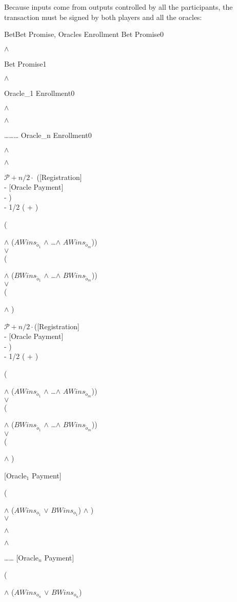 Because inputs come from outputs controlled by all the participants, the
  transaction must be signed by both players and all the oracles:
\newpage
{\small
\transaction
    {Bet}{Bet Promise, Oracles Enrollment}
    {Bet Promise}{0}{\signature{A} $\wedge$ \signature{B}}
    {Bet Promise}{1}{\signature{A} $\wedge$ \signature{B}}
    {Oracle_1 Enrollment}{0}
        {\signature{A} $\wedge$ \signature{B} $\wedge$ \signature{o_1}}
    {\ldots}{\ldots}{\ldots}
    {Oracle_n Enrollment}{0}
        {\signature{A} $\wedge$ \signature{B} $\wedge$ \signature{o_n}}
    \stopinputs
    {$\mathcal{P} + n/2 \cdot$ ([Registration] \\
            - [Oracle Payment] \\
            - ) \\
            - 1/2 ( + )}
        {(\signature{A} $\wedge$ ($AWins_{\tilde{o}_1}$ $\wedge$ \ldots $\wedge$ $AWins_{\tilde{o}_m}$)) \\
                          $\vee$ \\
         (\signature{B} $\wedge$ ($BWins_{\tilde{o}_1}$ $\wedge$ \ldots $\wedge$ $BWins_{\tilde{o}_m}$)) \\
                                    $\vee$ \\
         (\signature{A} $\wedge$ )}
    {$\mathcal{P} + n/2 \cdot $([Registration] \\
            - [Oracle Payment] \\
            - ) \\
            - 1/2 ( + )}
        {(\signature{A} $\wedge$ ($AWins_{\tilde{o}_1}$ $\wedge$ \ldots $\wedge$ $AWins_{\tilde{o}_m}$)) \\
                          $\vee$ \\
         (\signature{B} $\wedge$ ($BWins_{\tilde{o}_1}$ $\wedge$ \ldots $\wedge$ $BWins_{\tilde{o}_m}$)) \\
                                    $\vee$ \\
         (\signature{B} $\wedge$ )}
    {[Oracle$_{1}$ Payment]}{(\signature{o_{1}} $\wedge$ ($AWins_{o_{1}}$ $\vee$ $BWins_{o_{1}}$) %
                      $\wedge$ ) \\
                      $\vee$ \\
                       \signature{A} $\wedge$ \signature{B} $\wedge$ }
    {\ldots}{\ldots}
    {[Oracle$_{n}$ Payment]}{(\signature{o_{n}} $\wedge$ ($AWins_{o_{n}}$ $\vee$ $BWins_{o_{n}}$) %
}}
